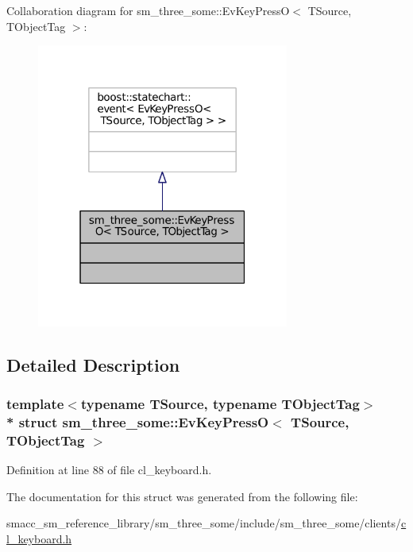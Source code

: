 Collaboration diagram for sm\+\_\+three\+\_\+some\+:\+:Ev\+Key\+PressO$<$ T\+Source, T\+Object\+Tag $>$\+:
\nopagebreak
\begin{figure}[H]
\begin{center}
\leavevmode
\includegraphics[width=235pt]{structsm__three__some_1_1EvKeyPressO__coll__graph}
\end{center}
\end{figure}


\subsection{Detailed Description}
\subsubsection*{template$<$typename T\+Source, typename T\+Object\+Tag$>$\\*
struct sm\+\_\+three\+\_\+some\+::\+Ev\+Key\+Press\+O$<$ T\+Source, T\+Object\+Tag $>$}



Definition at line 88 of file cl\+\_\+keyboard.\+h.



The documentation for this struct was generated from the following file\+:\begin{DoxyCompactItemize}
\item 
smacc\+\_\+sm\+\_\+reference\+\_\+library/sm\+\_\+three\+\_\+some/include/sm\+\_\+three\+\_\+some/clients/\hyperlink{cl__keyboard_8h}{cl\+\_\+keyboard.\+h}\end{DoxyCompactItemize}
